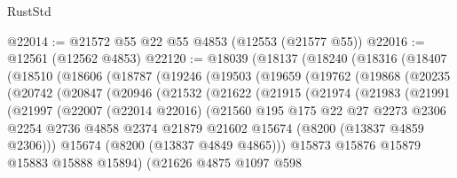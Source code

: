 \begin{lexlean}{RustStd}
\begin{coremodule}
@22014 := @21572 @55 @22 @55 @4853 (@12553 (@21577 @55))
@22016 := @12561 (@12562 @4853)
@22120 := @18039
    (@18137
      (@18240
        (@18316
          (@18407
            (@18510
              (@18606
                (@18787
                  (@19246
                    (@19503
                      (@19659
                        (@19762
                          (@19868
                            (@20235
                              (@20742
                                (@20847
                                  (@20946
                                    (@21532
                                      (@21622
                                        (@21915
                                          (@21974
                                            (@21983
                                              (@21991
                                                (@21997
                                                  (@22007
                                                    (@22014 @22016)
                                                    (@21560
                                                      @195
                                                      @175
                                                      @22
                                                      @27
                                                      @2273
                                                      @2306
                                                      @2254
                                                      @2736
                                                      @4858
                                                      @2374
                                                      @21879
                                                      @21602
                                                      @15674
                                                      (@8200 (@13837 @4859 @2306)))
                                                    @15674
                                                    (@8200 (@13837 @4849 @4865)))
                                                  @15873
                                                  @15876
                                                  @15879
                                                  @15883
                                                  @15888
                                                  @15894)
                                                (@21626
                                                  @4875
                                                  @1097
                                                  @598

\end{coremodule}
\end{lexlean}
